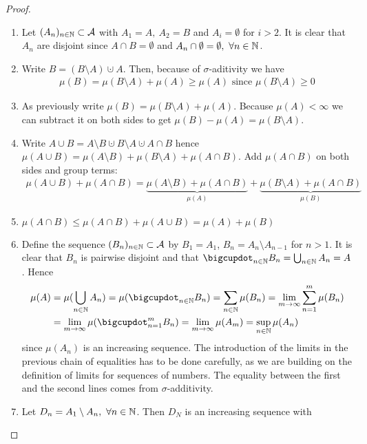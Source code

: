 \begin{proof}$ $\newline
	\begin{enumerate}
		\item Let $(A_n)_{n\in\mathbb{N}} \subset \mathcal{A}$ with $A_1 = A,\ A_2 = B$ and $A_i = \emptyset$ for $i > 2$. It is clear that $A_n$ are disjoint since $A\cap B = \emptyset$ and $A_n \cap \emptyset = \emptyset,\ \forall n \in \mathbb{N}$.
		\item Write $B = (B\setminus A) \cupdot A$. Then, because of $\sigma$-aditivity we have
		\begin{align*}
		\mu(B) = \mu(B\setminus A) + \mu(A) \geq \mu(A) \text{ since } \mu(B\setminus A) \geq 0
		\end{align*} 
		\item As previously write $\mu(B) = \mu(B\setminus A) + \mu(A)$. Because $\mu(A) < \infty$ we can subtract it on both sides to get $\mu(B) -\mu(A) = \mu(B\setminus A)$.
		\item Write $A \cup B = A \setminus B \cupdot B \setminus A \cupdot A \cap B$ hence $\mu(A \cup B) = \mu(A \setminus B) + \mu(B \setminus A) + \mu(A \cap B)$. Add $\mu(A \cap B)$ on both sides and group terms:
		\begin{align*}
		\mu(A \cup B) + \mu(A \cap B) = \underbrace{\mu(A \setminus B) + \mu(A \cap B)}_{\mu(A)} + \underbrace{\mu(B \setminus A) + \mu(A \cap B)}_{\mu(B)}
		\end{align*}
		\item $\mu(A\cap B) \leq \mu(A \cap B)+ \mu(A \cup B) = \mu(A) + \mu(B)$
		\item Define the sequence $(B_n)_{n\in\mathbb{N}} \subset \mathcal{A}$ by $B_1 = A_1$, $B_n = A_n\setminus A_{n-1}$ for $n > 1$. It is clear that $B_n$ is pairwise disjoint and that $\bigcupdot_{n \in \N} B_n = \bigcup_{n \in \N} A_n = A$. Hence
		\begin{align*}
		\mu(A) &= \mu(\bigcup_{n \in \N} A_n) = \mu(\bigcupdot_{n \in \N} B_n) = \sum_{n\in \N} \mu(B_n) = \lim_{m \to \infty} \sum_{n = 1}^m\mu(B_n) \\
		&= \lim_{m \to \infty} \mu (\bigcupdot_{n = 1}^m B_n) = \lim_{m \to \infty} \mu (A_m) = \sup_{n\in\N} \mu(A_n)
		\end{align*}
		since $\mu(A_n)$ is an increasing sequence. The introduction of the limits in the previous chain of equalities has to be done carefully, as we are building on the definition of limits for sequences of numbers. The equality between the first and the second lines comes from $\sigma$-additivity.
		\item Let $D_n = A_1 \setminus A_n,\ \forall n \in \mathbb{N}$. Then $D_N$ is an increasing sequence with

\end{enumerate}
\end{proof}
